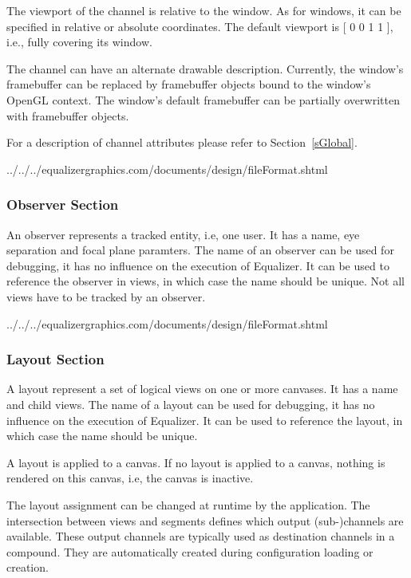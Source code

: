 \documentclass[10pt,a4]{scrartcl}
\newcommand{\sref}[1]{Section~\ref{#1}}
\begin{document}
The viewport of the channel is relative to the window. As for windows,
it can be specified in relative or absolute coordinates. The default
viewport is \textsf{[ 0 0 1 1 ]}, i.e., fully covering its window.

The channel can have an alternate drawable description. Currently, the
window's framebuffer can be replaced by framebuffer objects bound to the
window's OpenGL context. The window's default framebuffer can be
partially overwritten with framebuffer objects.

For a description of channel attributes please refer to \sref{sGlobal}.

{\footnotesize
  {../../../equalizergraphics.com/documents/design/fileFormat.shtml}}

\subsubsection{Observer Section}

An observer represents a tracked entity, i.e, one user. It has a name, eye
separation and focal plane paramters. The name of an observer can be used for
debugging, it has no influence on the execution of Equalizer. It can be used to
reference the observer in views, in which case the name should be unique. Not
all views have to be tracked by an observer.

{\footnotesize
  {../../../equalizergraphics.com/documents/design/fileFormat.shtml}}

\subsubsection{Layout Section}

A layout represent a set of logical views on one or more canvases. It
has a name and child views. The name of a layout can be used for
debugging, it has no influence on the execution of Equalizer. It can be
used to reference the layout, in which case the name should be unique.

A layout is applied to a canvas. If no layout is applied to a canvas,
nothing is rendered on this canvas, i.e, the canvas is inactive.

The layout assignment can be changed at runtime by the application. The
intersection between views and segments defines which output
(sub-)channels are available. These output channels are typically used
as destination channels in a compound. They are automatically created
during configuration loading or creation.
\end{document}
